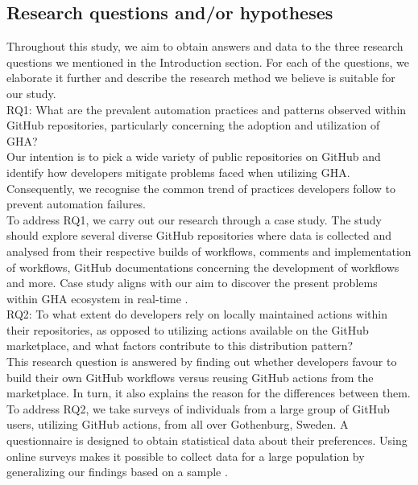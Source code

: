\documentclass[conference]{IEEEtran}
\begin{document}
\subsection{Research questions and/or hypotheses}
Throughout this study, we aim to obtain answers and data to the three research questions we mentioned in the Introduction section. For each of the questions, we elaborate it further and describe the research method we believe is suitable for our study.\\

RQ1: What are the prevalent automation practices and   patterns observed within GitHub repositories, particularly concerning the adoption and utilization of GHA?\\ 

        Our intention is to pick a wide variety of public repositories on GitHub and identify how developers mitigate problems faced when utilizing GHA. Consequently, we recognise the common trend of practices developers follow to prevent automation failures. \\

To address RQ1, we carry out our research through a case study. The study should explore several diverse GitHub repositories where data is collected and analysed from their respective builds of workflows, comments and implementation of workflows, GitHub documentations concerning the development of workflows and more. Case study aligns with our aim to discover the present problems within GHA ecosystem in real-time \cite{b18}.\\

RQ2: To what extent do developers rely on locally maintained actions within their repositories, as opposed to utilizing actions available on the GitHub marketplace, and what factors contribute to this distribution pattern?\\
	
This research question is answered by finding out whether developers favour to build their own GitHub workflows versus reusing GitHub actions from the marketplace. In turn, it also explains the reason for the differences between them.\\

To address RQ2, we take surveys of individuals from a large group of GitHub users, utilizing GitHub actions, from all over Gothenburg, Sweden. A questionnaire is designed to obtain statistical data about their preferences. Using online surveys makes it possible to collect data for a large population by generalizing our findings based on a sample \cite{b19}.\\
\end{document}
